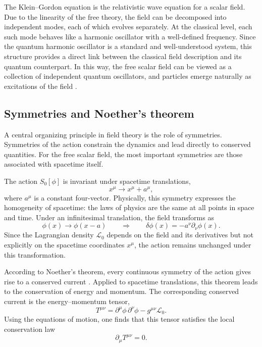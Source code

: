 The Klein--Gordon equation is the relativistic wave equation for a
scalar field. Due to the linearity of the free theory, the field can be
decomposed into independent modes, each of which evolves separately. At the
classical level, each such mode behaves like a harmonic oscillator with a
well-defined frequency. Since the quantum harmonic oscillator is a standard and
well-understood system, this structure provides a direct link between the
classical field description and its quantum counterpart. In this way, the free
scalar field can be viewed as a collection of independent quantum oscillators,
and particles emerge naturally as excitations of the field \cite{Kachelriess2017}.

\subsection*{Symmetries and Noether's theorem}

A central organizing principle in field theory is the role of symmetries.
Symmetries of the action constrain the dynamics and lead directly to conserved
quantities. For the free scalar field, the most important symmetries are those
associated with spacetime itself.

The action $S_0[\phi]$ is invariant under spacetime translations,
\begin{equation}
x^\mu \rightarrow x^\mu + a^\mu ,
\end{equation}
where $a^\mu$ is a constant four-vector. Physically, this symmetry expresses the
homogeneity of spacetime: the laws of physics are the same at all points in
space and time. Under an infinitesimal translation, the field transforms as
\begin{equation}
\phi(x) \rightarrow \phi(x-a)
\qquad \Rightarrow \qquad
\delta\phi(x) = -a^\nu \partial_\nu \phi(x) .
\end{equation}
Since the Lagrangian density $\mathcal{L}_0$ depends on the field and its
derivatives but not explicitly on the spacetime coordinates $x^\mu$, the action
remains unchanged under this transformation.

According to Noether's theorem, every continuous symmetry of the action gives
rise to a conserved current \cite{Noether1918,Weinberg1995}. Applied to spacetime
translations, this theorem leads to the conservation of energy and momentum. The
corresponding conserved current is the energy--momentum tensor,
\begin{equation}
T^{\mu\nu}
= \partial^\mu \phi\, \partial^\nu \phi
- g^{\mu\nu}\mathcal{L}_0 .
\end{equation}
Using the equations of motion, one finds that this tensor satisfies the local
conservation law
\begin{equation}
\partial_\mu T^{\mu\nu} = 0 .
\end{equation}

